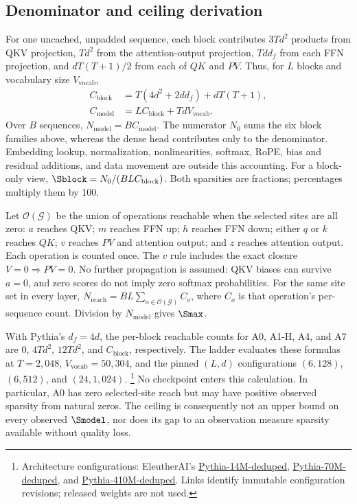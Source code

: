 \subsection{Denominator and ceiling derivation}
\label{app:ceiling}

For one uncached, unpadded sequence, each block contributes $3Td^2$ products
from QKV projection, $Td^2$ from the attention-output projection, $Td d_f$ from
each FFN projection, and $dT(T+1)/2$ from each of $QK$ and $PV$.
Thus, for $L$ blocks and vocabulary size $V_{\!\mathrm{vocab}}$,
\begin{equation}
\begin{split}
C_{\mathrm{block}}&=T(4d^2+2dd_f)+dT(T+1),\\
C_{\mathrm{model}}&=LC_{\mathrm{block}}+TdV_{\!\mathrm{vocab}}.
\end{split}
\label{eq:denominator}
\end{equation}
Over $B$ sequences, $N_{\mathrm{model}}=BC_{\mathrm{model}}$. The numerator
$N_0$ sums the six block families above, whereas the dense head contributes
only to the denominator. Embedding lookup, normalization, nonlinearities,
softmax, RoPE, bias and residual additions, and data movement are outside this
accounting. For a block-only view, $\Sblock=N_0/(BLC_{\mathrm{block}})$.
Both sparsities are fractions; percentages multiply them by 100.

Let $\mathcal{O}(\mathcal{G})$ be the union of operations reachable when the
selected sites are all zero: $a$ reaches QKV; $m$ reaches FFN up; $h$ reaches
FFN down; either $q$ or $k$ reaches $QK$; $v$ reaches $PV$ and attention output;
and $z$ reaches attention output. Each operation is counted once.
The $v$ rule includes the exact closure $V=0\Rightarrow PV=0$. No further
propagation is assumed: QKV biases can survive $a=0$, and zero scores do not
imply zero softmax probabilities. For the same site set in every layer,
$N_{\mathrm{reach}}=BL\sum_{o\in\mathcal{O}(\mathcal{G})}C_o$, where $C_o$
is that operation's per-sequence count. Division by $N_{\mathrm{model}}$ gives
$\Smax$.

With Pythia's $d_f=4d$, the per-block reachable counts for A0, A1-H, A4, and A7
are $0$, $4Td^2$, $12Td^2$, and $C_{\mathrm{block}}$, respectively. The ladder
evaluates these formulas at $T=2{,}048$, $V_{\!\mathrm{vocab}}=50{,}304$, and
the pinned $(L,d)$ configurations $(6,128)$, $(6,512)$, and $(24,1{,}024)$.%
\footnote{Architecture configurations: EleutherAI's
\href{https://huggingface.co/EleutherAI/pythia-14m-deduped/blob/7386d9a4ae45aef494a6e704910394def3037fc5/config.json}{Pythia-14M-deduped},
\href{https://huggingface.co/EleutherAI/pythia-70m-deduped/blob/e93a9faa9c77e5d09219f6c868bfc7a1bd65593c/config.json}{Pythia-70M-deduped}, and
\href{https://huggingface.co/EleutherAI/pythia-410m-deduped/blob/b5e8535141902c0e985cea61fd02afe7fe86af32/config.json}{Pythia-410M-deduped}.
Links identify immutable configuration revisions; released weights are not used.}
No checkpoint enters this calculation. In particular, A0 has zero selected-site
reach but may have positive observed sparsity from natural zeros. The ceiling
is consequently not an upper bound on every observed $\Smodel$, nor does its
gap to an observation measure sparsity available without quality loss.

